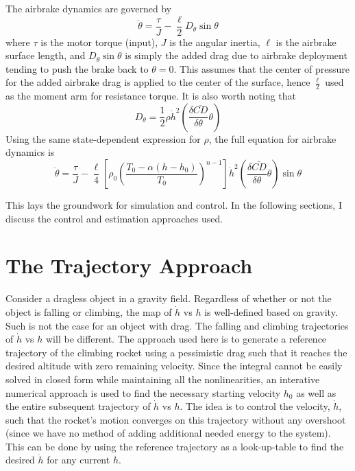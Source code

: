 \documentclass{article}
\begin{document}
  The airbrake dynamics are governed by
  \begin{equation}
    \ddot{\theta} = \frac{\tau}{J} - \frac{\ell}{2}D_\theta \sin \theta
  \end{equation}
  where $\tau$ is the motor torque (input), $J$ is the angular inertia, $\ell$ is the airbrake surface length, and $D_\theta \sin \theta$ is simply the added drag due to airbrake deployment tending to push the brake back to $\theta=0$. This assumes that the center of pressure for the added airbrake drag is applied to the center of the surface, hence $\frac{\ell}{2}$ used as the moment arm for resistance torque. It is also worth noting that
  \begin{equation}
    D_\theta = \frac{1}{2} \rho \dot{h}^2 \left(\frac{\delta\bar{CD}}{\delta\theta} \theta \right)
  \end{equation}
  Using the same state-dependent expression for $\rho$, the full equation for airbrake dynamics is
  \begin{equation}
    \ddot{\theta} = \frac{\tau}{J} - \frac{\ell}{4} \left[ \rho_0 \left(   \frac{T_0 - \alpha\left( h-h_0 \right)}{T_0}   \right)^{n-1} \right] \dot{h}^2 \left(\frac{\delta\bar{CD}}{\delta\theta} \theta \right) \sin \theta
  \end{equation}

  This lays the groundwork for simulation and control. In the following sections, I discuss the control and estimation approaches used.

\section{The Trajectory Approach}
  Consider a dragless object in a gravity field. Regardless of whether or not the object is falling or climbing, the map of $\dot{h}$ vs $h$ is well-defined based on gravity. Such is not the case for an object with drag. The falling and climbing trajectories of $\dot{h}$ vs $h$ will be different. The approach used here is to generate a reference trajectory of the climbing rocket using a pessimistic drag such that it reaches the desired altitude with zero remaining velocity. Since the integral cannot be easily solved in closed form while maintaining all the nonlinearities, an interative numerical approach is used to find the necessary starting velocity $h_0$ as well as the entire subsequent trajectory of $\dot{h}$ vs $h$. The idea is to control the velocity, $\dot{h}$, such that the rocket's motion converges on this trajectory without any overshoot (since we have no method of adding additional needed energy to the system). This can be done by using the reference trajectory as a look-up-table to find the desired $\dot{h}$ for any current $h$.
\end{document}
